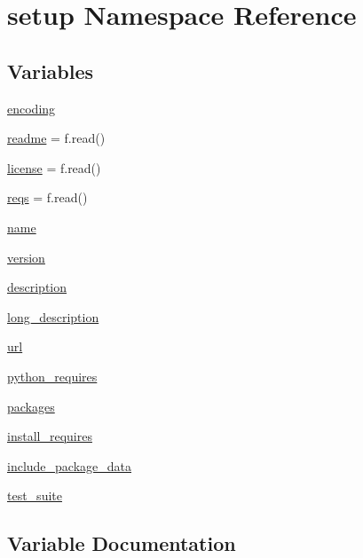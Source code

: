 \hypertarget{namespacesetup}{}\section{setup Namespace Reference}
\label{namespacesetup}
\subsection*{Variables}
\begin{DoxyCompactItemize}
\item 
\hyperlink{namespacesetup_a443be2d01fd539bf6761aff70724d876}{encoding}
\item 
\hyperlink{namespacesetup_af307481f158da7b58a33229df5e30c6c}{readme} = f.\+read()
\item 
\hyperlink{namespacesetup_a8ed6f50a28bd6a8794f8e1153baa6de9}{license} = f.\+read()
\item 
\hyperlink{namespacesetup_a0c29631fa586cf133cd55999a817f46b}{reqs} = f.\+read()
\item 
\hyperlink{namespacesetup_ab3a7a0638d76a01367c5bc3cc699447f}{name}
\item 
\hyperlink{namespacesetup_a2aa722b36a933088812b50ea79b97a5c}{version}
\item 
\hyperlink{namespacesetup_aedf461ec52a946bda975938ba0b93ec0}{description}
\item 
\hyperlink{namespacesetup_a4cda9dbfb952875376a0749fe08a5bde}{long\+\_\+description}
\item 
\hyperlink{namespacesetup_afc13124aa5c0124e84e1d965e3f4b0fb}{url}
\item 
\hyperlink{namespacesetup_aa7ca7bc9391b217e81efeb03689d8dbf}{python\+\_\+requires}
\item 
\hyperlink{namespacesetup_aff2375a361fd5865c77bd9aa093be747}{packages}
\item 
\hyperlink{namespacesetup_abead4f26b530856f858f0d44c7cf2588}{install\+\_\+requires}
\item 
\hyperlink{namespacesetup_a35139105b25ef46629d31888bad595d8}{include\+\_\+package\+\_\+data}
\item 
\hyperlink{namespacesetup_afd7a7f31bfa5027bfe335aedfcc1b70e}{test\+\_\+suite}
\end{DoxyCompactItemize}


\subsection{Variable Documentation}
\mbox{\label{namespacesetup_aedf461ec52a946bda975938ba0b93ec0}} 
